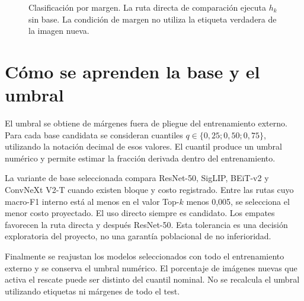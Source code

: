 \begin{figure}[!htbp]\centering
{}
\caption{Clasificación por margen. La ruta directa de comparación ejecuta \(h_k\) sin base. La condición de margen no utiliza la etiqueta verdadera de la imagen nueva.}
\label{fig:tk-inference}
\end{figure}

\section{Cómo se aprenden la base y el umbral}
El umbral se obtiene de márgenes fuera de pliegue del entrenamiento externo. Para cada base candidata se consideran cuantiles \(q\in\{0,25;0,50;0,75\}\), utilizando la notación decimal de esos valores. El cuantil produce un umbral numérico y permite estimar la fracción derivada dentro del entrenamiento.

La variante de base seleccionada compara ResNet-50, SigLIP, BEiT-v2 y ConvNeXt V2-T cuando existen bloque y costo registrado. Entre las rutas cuyo macro-F1 interno está al menos en el valor Top-\(k\) menos 0,005, se selecciona el menor costo proyectado. El uso directo siempre es candidato. Los empates favorecen la ruta directa y después ResNet-50. Esta tolerancia es una decisión exploratoria del proyecto, no una garantía poblacional de no inferioridad.

Finalmente se reajustan los modelos seleccionados con todo el entrenamiento externo y se conserva el umbral numérico. El porcentaje de imágenes nuevas que activa el rescate puede ser distinto del cuantil nominal. No se recalcula el umbral utilizando etiquetas ni márgenes de todo el test.

